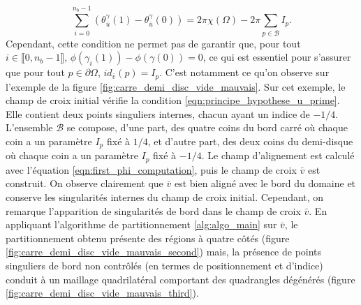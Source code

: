 \begin{equation}
    \sum_{i=0}^{n_b-1}\left(\theta_{\bar{u}}^\gamma(1)-\theta_{\bar{u}}^\gamma(0)\right)=2\pi\chi(\Omega)-2\pi\sum_{p\in\mathcal{B}}I_p.
    \label{eqn:principe_hypothese_u_prime}
\end{equation}
Cependant, cette condition ne permet pas de garantir que, pour tout $i\in\llbracket0, n_b-1\rrbracket$, $\phi(\gamma_i(1))-\phi(\gamma(0))=0$, ce qui est essentiel pour s'assurer que pour tout $p\in\partial \Omega$, $id_{\bar{v}}(p)= I_p$. C'est notamment ce qu'on observe sur l'exemple de la figure \ref{fig:carre_demi_disc_vide_mauvais}. Sur cet exemple, le champ de croix initial vérifie la condition \eqref{eqn:principe_hypothese_u_prime}. Elle contient deux points singuliers internes, chacun ayant un indice de $-1/4$. L'ensemble $\mathcal{B}$ se compose, d'une part, des quatre coins du bord carré où chaque coin a un paramètre $I_p$ fixé à $1/4$, et d'autre part, des deux coins du demi-disque où chaque coin a un paramètre $I_p$ fixé à $-1/4$. Le champ d'alignement est calculé avec l'équation \eqref{eqn:first_phi_computation}, puis le champ de croix $\bar{v}$ est construit. On observe clairement que $\bar{v}$ est bien aligné avec le bord du domaine et conserve les singularités internes du champ de croix initial. Cependant, on remarque l'apparition de singularités de bord dans le champ de croix $\bar{v}$. En appliquant l'algorithme de partitionnement \ref{alg:algo_main} sur $\bar{v}$, le partitionnement obtenu présente des régions à quatre côtés (figure \ref{fig:carre_demi_disc_vide_mauvais_second}) mais, la présence de points singuliers de bord non contrôlés (en termes de positionnement et d'indice) conduit à un maillage quadrilatéral comportant des quadrangles dégénérés (figure \ref{fig:carre_demi_disc_vide_mauvais_third}).

